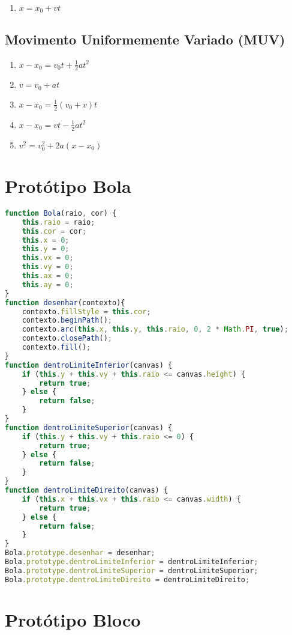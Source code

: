 \documentclass[12pt,a4paper,oneside]{article}
\begin{document}
\begin{enumerate}
	\item $x = x_0 + vt$ 
\end{enumerate}

\subsection{Movimento Uniformemente Variado (MUV)}

\begin{enumerate}
	\item $x - x_0 = v_0t + \frac{1}{2}at^2$ 
	\item $v = v_0 + at$ 
	\item $x - x_0 = \frac{1}{2}(v_0 + v)t$ 
	\item $x - x_0 = vt - \frac{1}{2} a t^2$
	\item $v^2 = v_0^2 + 2a(x - x_0)$
\end{enumerate}

\section*{Protótipo Bola}

\begin{lstlisting}[language=JavaScript]
function Bola(raio, cor) {
	this.raio = raio;
	this.cor = cor;
	this.x = 0;
	this.y = 0;
	this.vx = 0;
	this.vy = 0;
	this.ax = 0;
	this.ay = 0;
}
function desenhar(contexto){
	contexto.fillStyle = this.cor;
	contexto.beginPath();
	contexto.arc(this.x, this.y, this.raio, 0, 2 * Math.PI, true);
	contexto.closePath();
	contexto.fill();
}
function dentroLimiteInferior(canvas) {
	if (this.y + this.vy + this.raio <= canvas.height) {
		return true;
	} else {
		return false;
	}
}
function dentroLimiteSuperior(canvas) {
	if (this.y + this.vy + this.raio <= 0) {
		return true;
	} else {
		return false;
	}
}
function dentroLimiteDireito(canvas) {
	if (this.x + this.vx + this.raio <= canvas.width) {
		return true;
	} else {
		return false;
	}
}
Bola.prototype.desenhar = desenhar;
Bola.prototype.dentroLimiteInferior = dentroLimiteInferior;
Bola.prototype.dentroLimiteSuperior = dentroLimiteSuperior;
Bola.prototype.dentroLimiteDireito = dentroLimiteDireito;
\end{lstlisting}

\section*{Protótipo Bloco}
\end{document}
